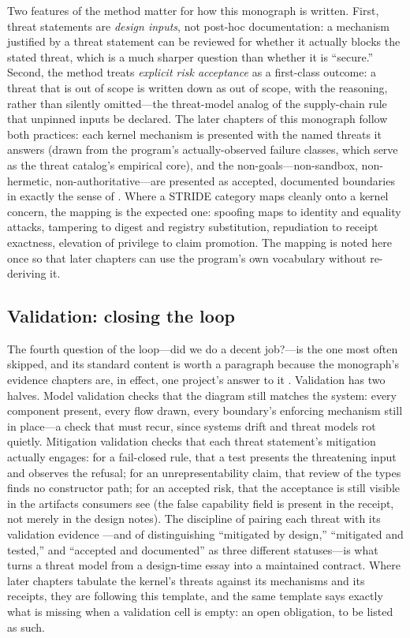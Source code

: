 Two features of the method matter for how this monograph is written.
First, threat statements are \emph{design inputs}, not post-hoc
documentation: a mechanism justified by a threat statement can be
reviewed for whether it actually blocks the stated threat, which is
a much sharper question than whether it is ``secure.'' Second, the
method treats \emph{explicit risk acceptance} as a first-class
outcome: a threat that is out of scope is written down as out of
scope, with the reasoning, rather than silently omitted---the
threat-model analog of the supply-chain rule that unpinned inputs
be declared. The later chapters of this monograph follow both
practices: each kernel mechanism is presented with the named threats
it answers (drawn from the program's actually-observed failure
classes, which serve as the threat catalog's empirical core), and
the non-goals---non-sandbox, non-hermetic, non-authoritative---are
presented as accepted, documented boundaries in exactly the sense
of \cite{shostack}. Where a STRIDE category maps cleanly onto a
kernel concern, the mapping is the expected one: spoofing maps to
identity and equality attacks, tampering to digest and registry
substitution, repudiation to receipt exactness, elevation of
privilege to claim promotion. The mapping is noted here once so
that later chapters can use the program's own vocabulary without
re-deriving it.

\subsection{Validation: closing the loop}\label{ch02:threat-validation}

The fourth question of the loop---did we do a decent job?---is the
one most often skipped, and its standard content is worth a
paragraph because the monograph's evidence chapters are, in effect,
one project's answer to it \cite{shostack}. Validation has two
halves. Model validation checks that the diagram still matches the
system: every component present, every flow drawn, every boundary's
enforcing mechanism still in place---a check that must recur,
since systems drift and threat models rot quietly. Mitigation
validation checks that each threat statement's mitigation actually
engages: for a fail-closed rule, that a test presents the
threatening input and observes the refusal; for an
unrepresentability claim, that review of the types finds no
constructor path; for an accepted risk, that the acceptance is
still visible in the artifacts consumers see (the false capability
field is present in the receipt, not merely in the design notes).
The discipline of pairing each threat with its validation evidence
---and of distinguishing ``mitigated by design,'' ``mitigated and
tested,'' and ``accepted and documented'' as three different
statuses---is what turns a threat model from a design-time essay
into a maintained contract. Where later chapters tabulate the
kernel's threats against its mechanisms and its receipts, they are
following this template, and the same template says exactly what
is missing when a validation cell is empty: an open obligation,
to be listed as such.


